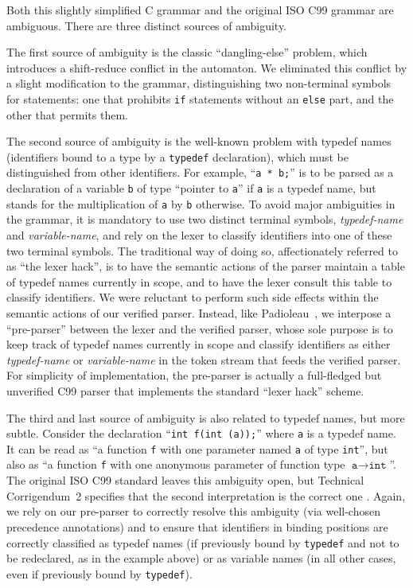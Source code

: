 \documentclass{llncs}
\begin{document}
Both this slightly simplified C grammar and the original ISO C99
grammar are ambiguous. There are three distinct sources of ambiguity.

The first source of ambiguity is the classic ``dangling-else'' problem, which
introduces a shift-reduce conflict in the \lrone automaton.  We eliminated
this conflict by a slight modification to the grammar, distinguishing two
non-terminal symbols for statements: one that prohibits \texttt{if} statements
without an \texttt{else} part, and the other that permits them.

The second source of ambiguity is the well-known problem with typedef
names (identifiers bound to a type by a \texttt{typedef}
declaration), which must be distinguished from other identifiers.
For example, ``\verb|a * b;|'' is to be parsed as a declaration of a
variable \verb|b| of type ``pointer to \verb|a|'' if \verb|a| is a
typedef name, but stands for the multiplication of \verb|a|
by \verb|b| otherwise.  To avoid major ambiguities in the grammar, it
is mandatory to use two distinct terminal symbols,  {\em typedef-name} and
{\em variable-name}, and rely on the lexer to classify
identifiers into one of these two terminal symbols.  The traditional way of
doing so, affectionately referred to as ``the lexer hack'', is to have
the semantic actions of the parser maintain a table of typedef names
currently in scope, and to have the lexer consult this table to
classify identifiers.  We were reluctant to perform such side effects within
the semantic actions of our verified parser.  Instead, like
Padioleau~\citeyear{Padioleau-09}, we interpose a ``pre-parser'' between
the lexer and the verified parser, whose sole purpose is to keep track
of typedef names currently in scope and classify identifiers as either
{\em typedef-name} or {\em variable-name} in the token stream that
feeds the verified parser.  For simplicity of implementation, the
pre-parser is actually a full-fledged but unverified C99 parser
that implements the standard ``lexer hack'' scheme.


The third and last source of ambiguity is also related to typedef names, but
more subtle.  Consider the declaration ``\verb|int f(int (a));|''
where \verb|a| is a typedef name.  It can be read as ``a
function \verb|f| with one parameter named \verb|a| of type \verb|int|'',
but also as ``a function \verb|f| with one anonymous parameter of
function type $\texttt{a} \rightarrow \texttt{int}$''.  The original ISO
C99 standard leaves this ambiguity open, but Technical Corrigendum~2
specifies that the second interpretation is the correct
one \cite[clause 6.7.5.3(11)]{ISO-C99}.  Again, we rely on our
pre-parser to correctly resolve this ambiguity (via well-chosen
precedence annotations) and to ensure that identifiers in binding
positions are correctly classified as typedef names (if previously
bound by \verb|typedef| and not to be redeclared, as in the example
above) or as variable names (in all other cases, even if previously bound
by \verb|typedef|).
\end{document}
